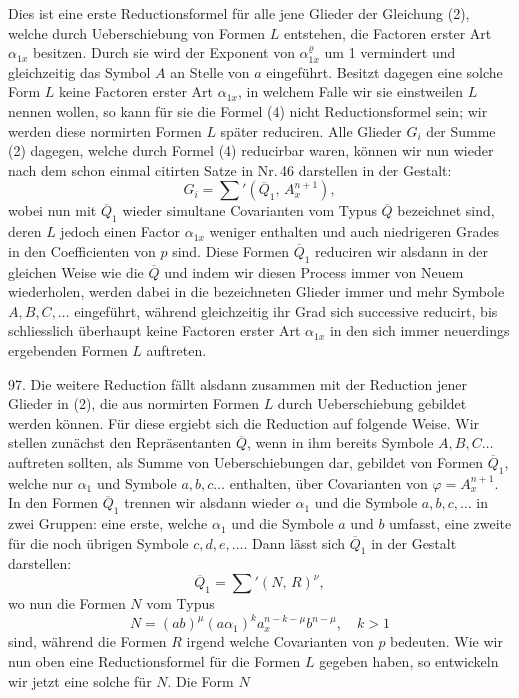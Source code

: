 \documentclass[11pt]{article}
\providecommand{\gesperrt}[1]{\textls[130]{#1}}
\providecommand{\weberpage}[1]{}
\begin{document}
\weberpage{103}
Dies ist eine erste Reductionsformel für alle jene Glieder der Gleichung (2), welche durch Ueberschiebung von Formen $L$ entstehen, die Factoren erster Art $\alpha_{1x}$ besitzen. Durch sie wird der Exponent von $\alpha_{1x}^\varrho$ um 1 vermindert und gleichzeitig das Symbol $A$ an Stelle von $a$ eingeführt. Besitzt dagegen eine solche Form $L$ keine Factoren erster Art $\alpha_{1x}$, in welchem Falle wir sie einstweilen \gesperrt{normirte Formen} $L$ nennen wollen, so kann für sie die Formel (4) nicht Reductionsformel sein; wir werden diese normirten Formen $L$ später reduciren. Alle Glieder $G_i$ der Summe (2) dagegen, welche durch Formel (4) reducirbar waren, können wir nun wieder nach dem schon einmal citirten Satze in Nr.\,46 darstellen in der Gestalt:
\[
G_i = \sum{}' (\overline{Q}_1,\, A_x^{n+1}),
\]
wobei nun mit $\overline{Q}_1$ wieder simultane Covarianten vom Typus $\overline{Q}$ bezeichnet sind, deren $L$ jedoch einen Factor $\alpha_{1x}$ weniger enthalten und auch niedrigeren Grades in den Coefficienten von $p$ sind. Diese Formen $\overline{Q}_1$ reduciren wir alsdann in der gleichen Weise wie die $\overline{Q}$ und indem wir diesen Process immer von Neuem wiederholen, werden dabei in die bezeichneten Glieder immer und mehr Symbole $A, B, C,\ldots$ eingeführt, während gleichzeitig ihr Grad sich successive reducirt, bis schliesslich überhaupt keine Factoren erster Art $\alpha_{1x}$ in den sich immer neuerdings ergebenden Formen $L$ auftreten.

97. Die weitere Reduction fällt alsdann zusammen mit der Reduction jener Glieder in (2), die aus normirten Formen $L$ durch Ueberschiebung gebildet werden können. Für diese ergiebt sich die Reduction auf folgende Weise. Wir stellen zunächst den Repräsentanten $\overline{Q}$, wenn in ihm bereits Symbole $A, B, C\ldots$ auftreten sollten, als Summe von Ueberschiebungen dar, gebildet von Formen $\overline{Q}_1$, welche nur $\alpha_1$ und Symbole $a, b, c\ldots$ enthalten, über Covarianten von $\varphi = A_x^{n+1}$. In den Formen $\overline{Q}_1$ trennen wir alsdann wieder $\alpha_1$ und die Symbole $a, b, c, \ldots$ in zwei Gruppen: eine erste, welche $\alpha_1$ und die Symbole $a$ und $b$ umfasst, eine zweite für die noch übrigen Symbole $c, d, e,\ldots$. Dann lässt sich $\overline{Q}_1$ in der Gestalt darstellen:
\[
\overline{Q}_1 = \sum{}' (N,\, R)^\nu,
\]
wo nun die Formen $N$ vom Typus
\[
N = (ab)^\mu (a\alpha_1)^k a_x^{n-k-\mu} b^{n-\mu}, \quad k > 1
\]
sind, während die Formen $R$ irgend welche Covarianten von $p$ bedeuten. Wie wir nun oben eine Reductionsformel für die Formen $L$ gegeben haben, so entwickeln wir jetzt eine solche für $N$. Die Form $N$
\end{document}
